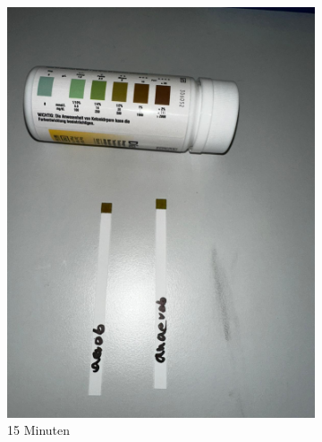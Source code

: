 \documentclass[10pt,a4paper]{article}
\begin{document}
\begin{figure}[H]
\begin{subfigure}[b]{0.4\textwidth}
			\includegraphics[width=\textwidth]{PHOTO-2024-07-04-23-51-29 2.jpg}
			\caption{15 Minuten}
			\label{fig:15 min}
		\end{subfigure}
		\begin{subfigure}[b]{0.4\textwidth}

\end{subfigure}
\end{figure}
\end{document}
